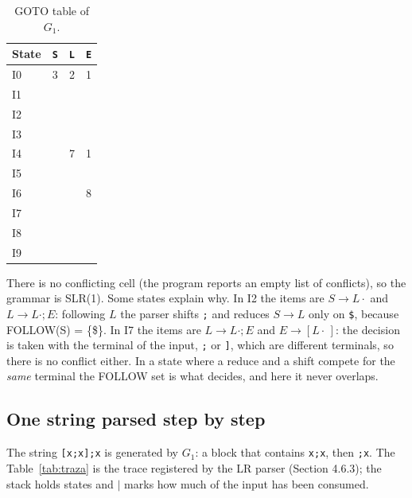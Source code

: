 \documentclass[11pt,letterpaper]{article}
\newcommand{\nt}[1]{\texttt{#1}}
\begin{document}
\begin{table}[H]
\centering
\small
\caption{GOTO table of $G_1$.}
\label{tab:goto}
\begin{tabular}{@{}l ccc@{}}
\toprule
\textbf{State} & \nt{S} & \nt{L} & \nt{E}\\
\midrule
I0 & 3 & 2 & 1\\
I1 & & & \\
I2 & & & \\
I3 & & & \\
I4 & & 7 & 1\\
I5 & & & \\
I6 & & & 8\\
I7 & & & \\
I8 & & & \\
I9 & & & \\
\bottomrule
\end{tabular}
\end{table}

There is no conflicting cell (the program reports an empty list of conflicts), so the grammar is
SLR(1). Some states explain why. In I2 the items are $S \to L\cdot$ and $L \to L\cdot;E$: following
$L$ the parser shifts \nt{;} and reduces $S \to L$ only on \nt{\$}, because FOLLOW(S) = \{\$\}. In I7
the items are $L \to L\cdot;E$ and $E \to [L\cdot\,]$: the decision is taken with the terminal of the
input, \nt{;} or \nt{]}, which are different terminals, so there is no conflict either. In a state
where a reduce and a shift compete for the \emph{same} terminal the FOLLOW set is what decides, and
here it never overlaps.

\subsection{One string parsed step by step}

The string \nt{[x;x];x} is generated by $G_1$: a block that contains \nt{x;x}, then \nt{;x}. The
Table~\ref{tab:traza} is the trace registered by the LR parser (Section 4.6.3); the stack holds
states and $\mid$ marks how much of the input has been consumed.
\end{document}

